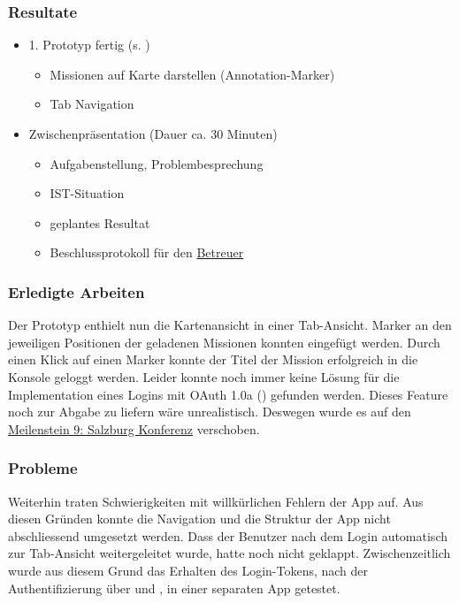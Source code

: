 \subsubsection{Resultate}
\begin{itemize}
	\item 1. Prototyp fertig (s. )
	\begin{itemize}
		\item Missionen auf Karte darstellen (Annotation-Marker)
		\item Tab Navigation
	\end{itemize}
	\item Zwischenpräsentation (Dauer ca. 30 Minuten)
	\begin{itemize}
		\item Aufgabenstellung, Problembesprechung
		\item IST-Situation
		\item geplantes Resultat
		\item Beschlussprotokoll für den \hyperref[pm-rollen]{Betreuer}
	\end{itemize}
\end{itemize}

\subsubsection{Erledigte Arbeiten}
Der Prototyp enthielt nun die Kartenansicht in einer Tab-Ansicht. 
Marker an den jeweiligen Positionen der geladenen Missionen konnten eingefügt werden.
Durch einen Klick auf einen Marker konnte der Titel der Mission erfolgreich in die Konsole geloggt werden.
Leider konnte noch immer keine Lösung für die Implementation eines Logins mit OAuth 1.0a () gefunden werden.
Dieses Feature noch zur Abgabe zu liefern wäre unrealistisch.
Deswegen wurde es auf den \hyperref[pm-ms9]{Meilenstein 9: Salzburg Konferenz} verschoben.

\subsubsection{Probleme}
Weiterhin traten Schwierigkeiten mit willkürlichen Fehlern der  App auf. 
Aus diesen Gründen konnte die Navigation und die Struktur der App nicht abschliessend umgesetzt werden.
Dass der Benutzer nach dem Login automatisch zur Tab-Ansicht weitergeleitet wurde, hatte noch nicht geklappt.
Zwischenzeitlich wurde aus diesem Grund das Erhalten des Login-Tokens, nach der Authentifizierung über  und , in einer separaten App getestet.


